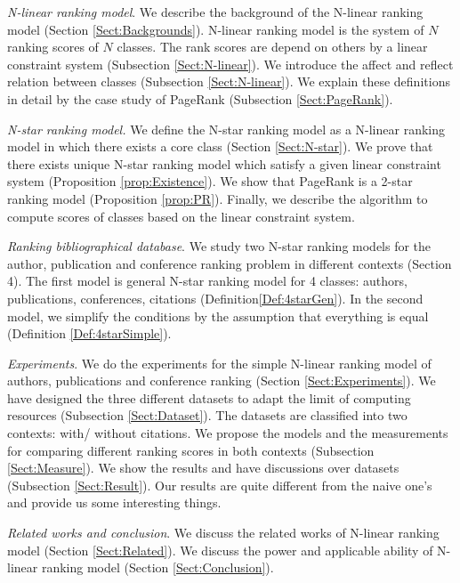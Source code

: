 \documentclass[10pt,leqno,twoside]{article}
\begin{document}
\textit{N-linear ranking model}. We describe the background of the  N-linear ranking model (Section \ref{Sect:Backgrounds}). N-linear ranking model is the system of $N$ ranking scores of $N$ classes. The rank scores are depend on others by a linear constraint system (Subsection \ref{Sect:N-linear}). We introduce the affect and reflect relation between classes (Subsection \ref{Sect:N-linear}). We explain these definitions in detail by the case study of PageRank (Subsection \ref{Sect:PageRank}).

\textit{N-star ranking model.} We define the N-star ranking model as a N-linear ranking model in which there exists a core class (Section \ref{Sect:N-star}). We prove that there exists unique N-star ranking model which satisfy  a given linear constraint system (Proposition \ref{prop:Existence}). We show that PageRank is a 2-star ranking model (Proposition \ref{prop:PR}). Finally, we describe the algorithm to compute scores of classes based on the linear constraint system.

\textit{Ranking bibliographical database}. We study two N-star ranking models for the author, publication and conference ranking problem in different contexts (Section 4).
The first model is general N-star ranking model for 4 classes: authors, publications, conferences, citations (Definition\ref{Def:4starGen}).
In the second model, we simplify the conditions by the assumption that everything is equal (Definition \ref{Def:4starSimple}).

\textit{Experiments}. We do the experiments for the simple  N-linear ranking model of authors, publications and conference ranking  (Section \ref{Sect:Experiments}). We have designed the three different datasets to adapt the limit of  computing resources (Subsection \ref{Sect:Dataset}). The datasets are classified into two contexts: with/ without citations.
We propose the models and the measurements for comparing different ranking scores in both contexts (Subsection \ref{Sect:Measure}). We show the results and have discussions over datasets (Subsection \ref{Sect:Result}).
Our results are quite different from the naive one's and provide us some interesting things.

\textit{Related works and conclusion}. We discuss the related works of N-linear ranking model (Section \ref{Sect:Related}).
We discuss the power and applicable ability of  N-linear ranking model (Section \ref{Sect:Conclusion}).




\end{document}

